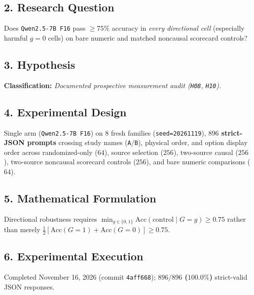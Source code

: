\subsection*{2. Research Question}
Does \texttt{Qwen2.5-7B F16} pass $\ge 75\%$ accuracy in \emph{every directional cell} (especially harmful $g=0$ cells) on bare numeric and matched noncausal scorecard controls?

\subsection*{3. Hypothesis}
\textbf{Classification:} \emph{Documented prospective measurement audit (\texttt{H08}, \texttt{H10}).}

\subsection*{4. Experimental Design}
Single arm (\texttt{Qwen2.5-7B F16}) on $8$ fresh families (\texttt{seed=20261119}), \textbf{$896$ strict-JSON prompts} crossing study names (\texttt{A}/\texttt{B}), physical order, and option display order across randomized-only ($64$), source selection ($256$), two-source causal ($256$), two-source noncausal scorecard controls ($256$), and bare numeric comparisons ($64$).

\subsection*{5. Mathematical Formulation}
Directional robustness requires $\min_{g \in \{0,1\}} \mathrm{Acc}(\text{control} \mid G=g) \ge 0.75$ rather than merely $\frac{1}{2}[\mathrm{Acc}(G=1) + \mathrm{Acc}(G=0)] \ge 0.75$.

\subsection*{6. Experimental Execution}
Completed November 16, 2026 (commit \texttt{4aff668}); \textbf{$896/896$ ($100.0\%$)} strict-valid JSON responses.


